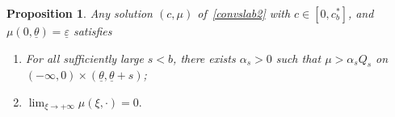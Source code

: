 \documentclass[11pt]{article}    %
\newtheorem{proposition}[theorem]{Proposition}
\newcommand{\eps}{\varepsilon}
\begin{document}
\begin{proposition}\label{prop:limits}
Any solution $(c,\mu)$ of~\eqref{convslab2}
with $c \in[0,c^*_b]$, and $\mu(0,\underline\theta) = \underline\eps$ satisfies\smallskip
\begin{enumerate}
	\item[(i)]\label{point:1} For all sufficiently large $s < b$, there exists $\alpha_s >0$ such that $\mu > \alpha_s Q_s$ on $(-\infty,0)\times(\underline\theta, \underline \theta + s)$;
%
	\item[(ii)]\label{point:2} $\lim_{\xi \to +\infty} \mu(\xi,\cdot) =0.$
\end{enumerate}
\end{proposition}
\end{document}
